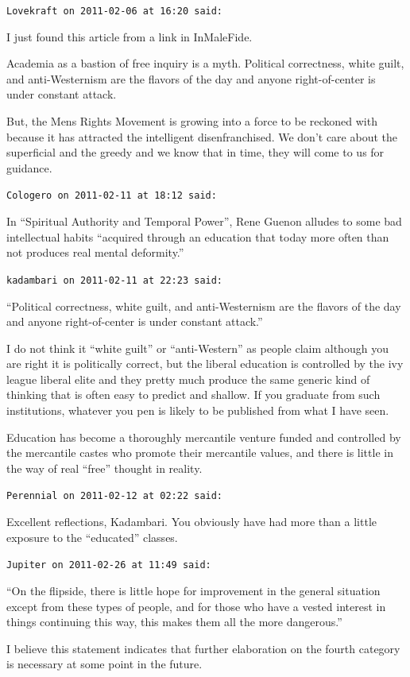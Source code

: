 \begin{footnotesize}
\begin{sffamily}
\texttt{Lovekraft on 2011-02-06 at 16:20 said:}

I just found this article from a link in InMaleFide.

Academia as a bastion of free inquiry is a myth. Political correctness, white guilt, and anti-Westernism are the flavors of the day and anyone right-of-center is under constant attack.

But, the Mens Rights Movement is growing into a force to be reckoned with because it has attracted the intelligent disenfranchised. We don't care about the superficial and the greedy and we know that in time, they will come to us for guidance.

\hfill

\texttt{Cologero on 2011-02-11 at 18:12 said:}

In ``Spiritual Authority and Temporal Power'', Rene Guenon alludes to some bad intellectual habits ``acquired through an education that today more often than not produces real mental deformity.''

\hfill

\texttt{kadambari on 2011-02-11 at 22:23 said:}

``Political correctness, white guilt, and anti-Westernism are the flavors of the day and anyone right-of-center is under constant attack.''

I do not think it ``white guilt'' or ``anti-Western'' as people claim although you are right it is politically correct, but the liberal education is controlled by the ivy league liberal elite and they pretty much produce the same generic kind of thinking that is often easy to predict and shallow. If you graduate from such institutions, whatever you pen is likely to be published from what I have seen.

Education has become a thoroughly mercantile venture funded and controlled by the mercantile castes who promote their mercantile values, and there is little in the way of real ``free'' thought in reality.

\hfill

\texttt{Perennial on 2011-02-12 at 02:22 said:}

Excellent reflections, Kadambari. You obviously have had more than a little exposure to the ``educated'' classes.

\hfill

\texttt{Jupiter on 2011-02-26 at 11:49 said:}

``On the flipside, there is little hope for improvement in the general situation except from these types of people, and for those who have a vested interest in things continuing this way, this makes them all the more dangerous.''

I believe this statement indicates that further elaboration on the fourth category is necessary at some point in the future.


\hfill

\end{sffamily}
\end{footnotesize}

